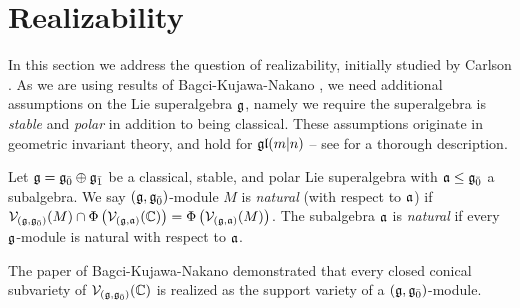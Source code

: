 
\section{Realizability}
\label{sec:realizability}

In this section we address the question of realizability, initially studied by Carlson \cite{MR723070}. As we are using results of Bagci-Kujawa-Nakano \cite{MR2448087}, we need additional assumptions on the Lie superalgebra $\mathfrak{g}$, namely we require the superalgebra is \emph{stable} and \emph{polar} in addition to being classical. These assumptions originate in geometric invariant theory, and hold for $\mathfrak{gl}(m|n)$ -- see \cite[\S 3.2-3.3]{BKN-1} for a thorough description.

\begin{definition}
  Let $\mathfrak{g} = {\mathfrak{g}}_{\bar{0}} \oplus {\mathfrak{g}}_{\bar{1}}$ be a classical, stable, and polar Lie superalgebra with $\mathfrak{a} \leq {\mathfrak{g}}_{\bar{0}}$ a subalgebra. We say $(\mathfrak{g},{\mathfrak{g}}_{\bar{0}})$-module $M$ is \emph{natural} (with respect to $\mathfrak{a}$) if $\mathcal{V}_{(\mathfrak{g},{\mathfrak{g}}_{\bar{0}})}(M) \cap \Phi\left(\mathcal{V}_{(\mathfrak{g},\mathfrak{a})}(\mathbb{C})\right) = \Phi\left(\mathcal{V}_{(\mathfrak{g},\mathfrak{a})}(M)\right)$. The subalgebra $\mathfrak{a}$ is \emph{natural} if every $\mathfrak{g}$-module is natural with respect to $\mathfrak{a}$.
\end{definition}

The paper of Bagci-Kujawa-Nakano \cite[Theorem 8.8.1]{MR2448087} demonstrated that every closed conical subvariety of $\mathcal{V}_{(\mathfrak{g},{\mathfrak{g}}_{\bar{0}})}(\mathbb{C})$ is realized as the support variety of a $(\mathfrak{g},{\mathfrak{g}}_{\bar{0}})$-module.

